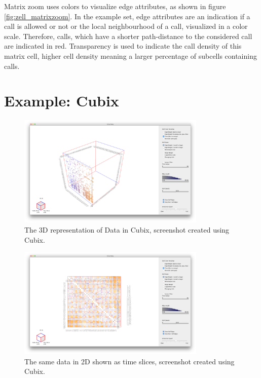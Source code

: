 Matrix zoom uses colors to visualize edge attributes, as shown in figure \ref{fig:zell_matrixzoom}. In the example set, edge attributes are an indication if a call is allowed or not or the local neighbourhood of a call, visualized in a color scale. Therefore, calls, which have a shorter path-distance to the considered call are indicated in red. Transparency is used to indicate the call density of this matrix cell, higher cell density meaning a larger percentage of subcells containing calls. \citep[227--232]{ham-ivis-2003}


\section{Example: Cubix}

\begin{figure}[H]
\centering
\includegraphics[width=0.8\textwidth]{images/cubix3d_cell}
\caption{The 3D representation of Data in Cubix, screenshot created using Cubix.\citep[877--886]{bach-cubix-2014}\label{fig:cell_cubix3d}}
\end{figure}

\begin{figure}[H]
\centering
\includegraphics[width=0.8\textwidth]{images/cubix2d_cell}
\caption{The same data in 2D shown as time slices, screenshot created using Cubix. \citep[877--886]{bach-cubix-2014}\label{fig:cell_cubix2d}}
\end{figure}


